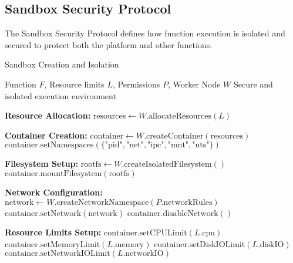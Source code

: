 \subsection{Sandbox Security Protocol}
\label{subsec:sandbox-protocol}

The Sandbox Security Protocol defines how function execution is isolated and secured to protect both the platform and other functions.

\begin{tcolorbox}[
    enhanced,
    colback=blue!5!white,
    colframe=blue!75!black,
    arc=5mm,
    boxrule=1.5pt,
    title=Sandbox Protocol,
    fonttitle=\bfseries,
    coltitle=white,
    attach boxed title to top left={yshift=-2mm, xshift=5mm},
    boxed title style={colback=blue!75!black, rounded corners},
    shadow={2mm}{-2mm}{0mm}{black!50},
    drop fuzzy shadow
]
\begin{tcolorbox}[
    enhanced,
    colback=blue!5!white,
    colframe=blue!75!black,
    arc=5mm,
    boxrule=1.5pt,
    title=Protocol,
    fonttitle=\bfseries,
    coltitle=white,
    attach boxed title to top left={yshift=-2mm, xshift=5mm},
    boxed title style={colback=blue!75!black, rounded corners},
    shadow={2mm}{-2mm}{0mm}{black!50},
    drop fuzzy shadow
]
\begin{protocol}{Sandbox Creation and Isolation}
\label{prot:sandbox-creation}
\begin{algorithmic}[1]
\Require Function $F$, Resource limits $L$, Permissions $P$, Worker Node $W$
\Ensure Secure and isolated execution environment

\State \textbf{Resource Allocation:}
\State $\text{resources} \gets W.\text{allocateResources}(L)$

\State \textbf{Container Creation:}
\State $\text{container} \gets W.\text{createContainer}(\text{resources})$
\State $\text{container}.\text{setNamespaces}(\{\text{"pid"}, \text{"net"}, \text{"ipc"}, \text{"mnt"}, \text{"uts"}\})$

\State \textbf{Filesystem Setup:}
\State $\text{rootfs} \gets W.\text{createIsolatedFilesystem}()$
\State $\text{container}.\text{mountFilesystem}(\text{rootfs})$

\State \textbf{Network Configuration:}
    \State $\text{network} \gets W.\text{createNetworkNamespace}(P.\text{networkRules})$
    \State $\text{container}.\text{setNetwork}(\text{network})$
\Else
    \State $\text{container}.\text{disableNetwork}()$
\EndIf

\State \textbf{Resource Limits Setup:}
\State $\text{container}.\text{setCPULimit}(L.\text{cpu})$
\State $\text{container}.\text{setMemoryLimit}(L.\text{memory})$
\State $\text{container}.\text{setDiskIOLimit}(L.\text{diskIO})$
\State $\text{container}.\text{setNetworkIOLimit}(L.\text{networkIO})$


\end{algorithmic}
\end{protocol}
\end{tcolorbox}
\end{tcolorbox}
